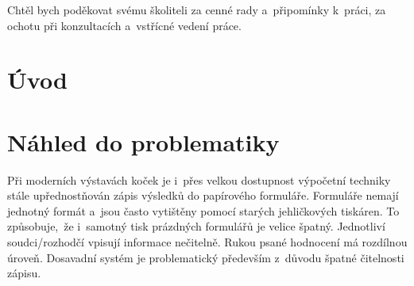 \documentclass[11pt, oneside]{fithesis2}
\begin{document}
\hyphenation{} %
\FrontMatter
\ThesisTitlePage

% 
% 

\begin{ThesisDeclaration}
\DeclarationText
\AdvisorName
\end{ThesisDeclaration}

\begin{ThesisThanks}
Chtěl bych poděkovat svému školiteli \iffalse doplnte \fi za
cenné rady a~připomínky k~práci, za ochotu při konzultacích a~vstřícné
vedení práce.
\end{ThesisThanks}

\begin{ThesisAbstract}

\end{ThesisAbstract}

\begin{ThesisKeyWords}

\end{ThesisKeyWords}



\MainMatter
\tableofcontents
\chapter{Úvod}


\chapter{Náhled do problematiky}
Při moderních výstavách koček je i~přes velkou dostupnost výpočetní techniky stále upřednostňován zápis výsledků do papírového formuláře.
Formuláře nemají jednotný formát a~jsou často vytištěny pomocí starých jehličkových tiskáren.
To způsobuje,~že i~samotný tisk prázdných formulářů je velice špatný. Jednotliví soudci/rozhodčí vpisují informace nečitelně. Rukou psané hodnocení má rozdílnou úroveň. Dosavadní systém je problematický především z~důvodu špatné
čitelnosti zápisu.
\end{document}
